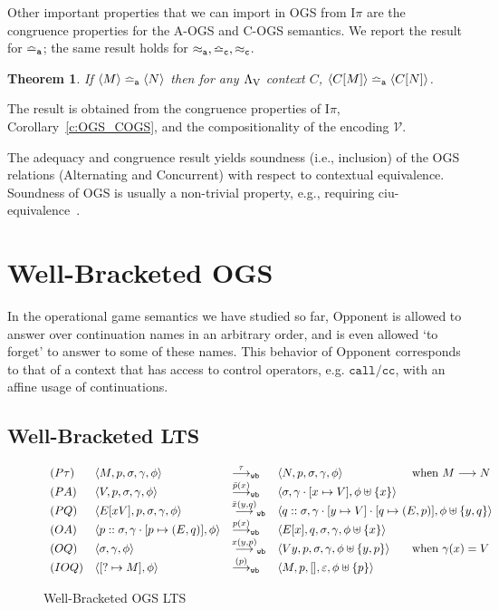 \documentclass[11pt,a4paper]{amsart}
\theoremstyle{plain}
\theoremstyle{definition}
\theoremstyle{defC}
\theoremstyle{thmC}
\theoremstyle{plain}
\numberwithin{equation}{section}
\newif\iflong\longtrue
\newcommand{\wrt}{with respect to\xspace}  %
\newcommand{\stt}{\sigma}
\newcommand{\AOGS}{\mbox{{\rm A-OGS}}\xspace}      %
\newcommand{\COGS}{\mbox{{\rm C-OGS}}\xspace}      %
\newcommand{\rmm}[1]{{\tt{\lowercase{#1}}}}
\newcommand{\genarr}[2]{\mathrel{\stackrel{{#1}}{\longrightarrow}_{\rmm{\lowercase{#2}}}}}
\newcommand{\arrWB}[1]{\genarr{#1}{WB}}           %
\newcommand{\genTE}[1]{\mathrel{\bumpeq_{\rmm{\lowercase{#1}}}}}       %
\newcommand{\genwb}[1]{\mathrel{\approx_{\rmm{\lowercase{#1}}}}}       %
\newcommand{\wbC}{\genwb{C}}       %
\newcommand{\wbA}{\genwb{A}}       %
\newcommand{\TEA}{\genTE{A}}       %
\newcommand{\TEp}{\genTE{C}}       %
\newcommand{\cbvSymb}{{\mathcal {V}}}
\newcommand{\LasV}{\Lambda_{\rm V}} %
\newcommand{\red}{\ensuremath\longrightarrow}
\newcommand{\Intp}{\mbox{I$\pi$}\xspace}   %
\newcommand{\piI}{\Intp}   %
\newcommand{\emptymap}{\varepsilon}
\newcommand{\pmap}[2]{[#1 \mapsto #2]}
\newcommand{\ansP}[2]{\bar{#1}(#2)}
\newcommand{\questPV}[3]{\bar{#1}(#2,#3)}
\newcommand{\ansO}[2]{#1(#2)}
\newcommand{\questOV}[3]{#1(#2,#3)}
\newcommand{\questOinit}[1]{(#1)}
\newcommand{\conf}[1]{\langle #1\rangle}
\newcommand{\initconf}[2]{\langle[? \mapsto #2], #1\rangle}
\theoremstyle{plain}
\newtheorem{theorem}[thm]{Theorem}
\theoremstyle{definition}
\begin{document}
\noindent
Other important properties that we can import in OGS from \piI
are the congruence properties for the \AOGS and \COGS semantics. 
We report the result for  $\TEA$; the same result holds for 
$\wbA,\TEp, \wbC$.
\begin{theorem}
 If $\conf{M} \TEA \conf{N}$
 then for any $\LasV$  context $C$, $\conf{C[M]} \TEA \conf{C[N]}$.
\end{theorem}

\noindent
The result is obtained  from the congruence properties of \piI, 
Corollary~\ref{c:OGS_COGS}, and the compositionality
of the encoding $\cbvSymb$.

\iflong
The adequacy and congruence result yields soundness (i.e., inclusion) 
of the OGS relations (Alternating and
Concurrent) \wrt contextual equivalence. Soundness of OGS
is usually a non-trivial property, e.g., requiring 
ciu-equivalence~\cite{laird2007}.


\fi %
\section{Well-Bracketed OGS}
\label{s:wb-ogs}

In the operational game semantics we have studied so far, Opponent is allowed to 
answer over continuation names in an arbitrary order, and is 
even allowed `to forget' to answer 
to some of these names.
This behavior of Opponent 
corresponds to that of a context that has 
access to control operators, e.g. $\mathtt{call/cc}$, with an affine usage of continuations.


\subsection{Well-Bracketed LTS}


\begin{figure}
\[\begin{array}{lllll}
 (P\tau) & \conf{M,p,\stt,\gamma,\phi} & \arrWB{\ \tau \ } & 
  \conf{N,p,\stt,\gamma,\phi} & \text{ when } M \red N\\
%
 (PA) & \conf{V,p,\stt,\gamma,\phi} & \arrWB{\ansP{p}{x}} & 
  \conf{\stt,\gamma \cdot \pmap{x}{V},\phi \uplus \{x\}} \\
%
 (PQ) & \conf{E[xV],p,\stt,\gamma,\phi} & \arrWB{\questPV{x}{y}{q}} & 
  \multicolumn{2}{c}
    {\conf{q::\stt,\gamma \cdot \pmap{y}{V}\cdot \pmap{q}{(E,p)},\phi \uplus \{y,q\}}} \\
%
 (OA) & \conf{p::\stt,\gamma\cdot [p \mapsto (E,q)],\phi} & \arrWB{\ansO{p}{x}} & 
  \conf{E[x],q,\stt,\gamma,\phi \uplus \{x\}} \\
%
 (OQ) & \conf{\stt,\gamma,\phi} & \arrWB{\questOV{x}{y}{p}} & 
  \conf{V y,p,\stt,\gamma,\phi \uplus \{y,p\}} & 
  \text{ when } \gamma(x) = V\\
%
 (IOQ) & \initconf{\phi}{M} & \arrWB{\questOinit{p}} &
     \conf{M,p,[],\emptymap,\phi \uplus \{p\}}
\end{array}\]
\caption{Well-Bracketed OGS LTS}
\label{fig:stacked-lts}
\end{figure}
\end{document}
